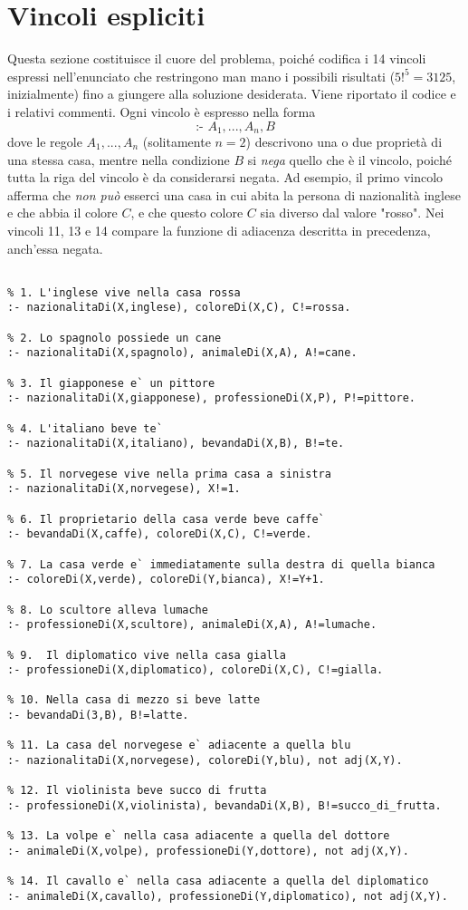\section{Vincoli espliciti}
Questa sezione costituisce il cuore del problema, poiché codifica i 14 vincoli espressi nell'enunciato che restringono man mano i possibili risultati ($5!^5 = 3125$, inizialmente) fino a giungere alla soluzione desiderata. Viene riportato il codice e i relativi commenti. Ogni vincolo è espresso nella forma $$\text{:- } A_1, ..., A_n, B$$ dove le regole $A_1, ..., A_n$ (solitamente $n = 2$) descrivono una o due proprietà di una stessa casa, mentre nella condizione $B$ si \emph{nega} quello che è il vincolo, poiché tutta la riga del vincolo è da considerarsi negata. Ad esempio, il primo vincolo afferma che \emph{non può} esserci una casa in cui abita la persona di nazionalità inglese e che abbia il colore $C$, e che questo colore $C$ sia diverso dal valore "rosso". Nei vincoli 11, 13 e 14 compare la funzione di adiacenza descritta in precedenza, anch'essa negata.
\clearpage{}
\begin{lstlisting}[frame=tb]
%% Vincoli espliciti

% 1. L'inglese vive nella casa rossa
:- nazionalitaDi(X,inglese), coloreDi(X,C), C!=rossa.

% 2. Lo spagnolo possiede un cane
:- nazionalitaDi(X,spagnolo), animaleDi(X,A), A!=cane.

% 3. Il giapponese e` un pittore
:- nazionalitaDi(X,giapponese), professioneDi(X,P), P!=pittore.

% 4. L'italiano beve te`
:- nazionalitaDi(X,italiano), bevandaDi(X,B), B!=te.

% 5. Il norvegese vive nella prima casa a sinistra
:- nazionalitaDi(X,norvegese), X!=1.

% 6. Il proprietario della casa verde beve caffe`
:- bevandaDi(X,caffe), coloreDi(X,C), C!=verde.

% 7. La casa verde e` immediatamente sulla destra di quella bianca
:- coloreDi(X,verde), coloreDi(Y,bianca), X!=Y+1.

% 8. Lo scultore alleva lumache
:- professioneDi(X,scultore), animaleDi(X,A), A!=lumache.

% 9.  Il diplomatico vive nella casa gialla
:- professioneDi(X,diplomatico), coloreDi(X,C), C!=gialla.

% 10. Nella casa di mezzo si beve latte
:- bevandaDi(3,B), B!=latte.

% 11. La casa del norvegese e` adiacente a quella blu
:- nazionalitaDi(X,norvegese), coloreDi(Y,blu), not adj(X,Y).

% 12. Il violinista beve succo di frutta
:- professioneDi(X,violinista), bevandaDi(X,B), B!=succo_di_frutta.

% 13. La volpe e` nella casa adiacente a quella del dottore
:- animaleDi(X,volpe), professioneDi(Y,dottore), not adj(X,Y).

% 14. Il cavallo e` nella casa adiacente a quella del diplomatico
:- animaleDi(X,cavallo), professioneDi(Y,diplomatico), not adj(X,Y).
\end{lstlisting}
